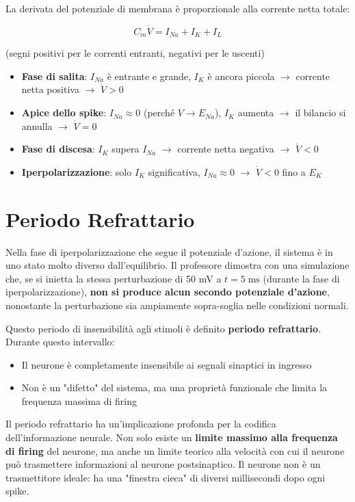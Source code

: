 La derivata del potenziale di membrana è proporzionale alla corrente netta totale:

\begin{equation}
C_m \dot{V} = I_{Na} + I_K + I_L
\end{equation}

(segni positivi per le correnti entranti, negativi per le uscenti)

\begin{itemize}
    \item \textbf{Fase di salita}: $I_{Na}$ è entrante e grande, $I_K$ è ancora piccola $\rightarrow$ corrente netta positiva $\rightarrow$ $\dot{V} > 0$
    \item \textbf{Apice dello spike}: $I_{Na} \approx 0$ (perché $V \to E_{Na}$), $I_K$ aumenta $\rightarrow$ il bilancio si annulla $\rightarrow$ $\dot{V} = 0$
    \item \textbf{Fase di discesa}: $I_K$ supera $I_{Na}$ $\rightarrow$ corrente netta negativa $\rightarrow$ $\dot{V} < 0$
    \item \textbf{Iperpolarizzazione}: solo $I_K$ significativa, $I_{Na} \approx 0$ $\rightarrow$ $\dot{V} < 0$ fino a $E_K$
\end{itemize}



\section{Periodo Refrattario}

Nella fase di iperpolarizzazione che segue il potenziale d'azione, il sistema è in uno stato molto diverso dall'equilibrio. Il professore dimostra con una simulazione che, se si inietta la stessa perturbazione di 50 mV a $t = 5 \; \text{ms}$ (durante la fase di iperpolarizzazione), \textbf{non si produce alcun secondo potenziale d'azione}, nonostante la perturbazione sia ampiamente sopra-soglia nelle condizioni normali.

Questo periodo di insensibilità agli stimoli è definito \textbf{periodo refrattario}. Durante questo intervallo:
\begin{itemize}
    \item Il neurone è completamente insensibile ai segnali sinaptici in ingresso
    \item Non è un "difetto" del sistema, ma una proprietà funzionale che limita la frequenza massima di firing
\end{itemize}

\begin{tcolorbox}[colback=gray!5, colframe=gray!40, arc=2mm, boxrule=0.5pt] Il periodo refrattario ha un'implicazione profonda per la codifica dell'informazione neurale. Non solo esiste un \textbf{limite massimo alla frequenza di firing} del neurone, ma anche un limite teorico alla velocità con cui il neurone può trasmettere informazioni al neurone postsinaptico. Il neurone non è un trasmettitore ideale: ha una "finestra cieca" di diversi millisecondi dopo ogni spike.
\end{tcolorbox}


